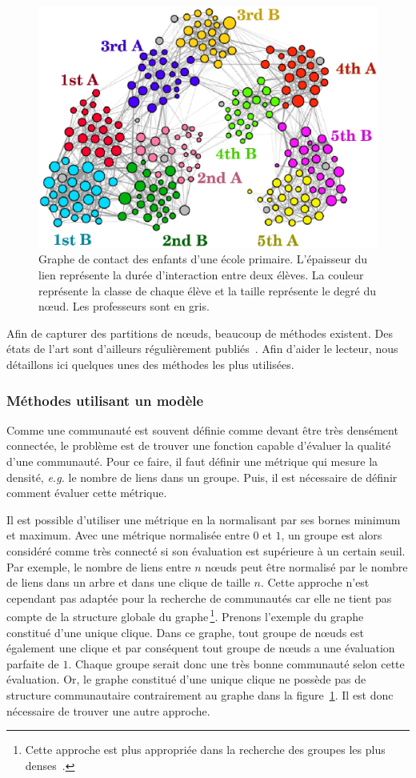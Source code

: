 \begin{figure}
\centering
\includegraphics[width=0.6\linewidth]{img/Intro/ecole_primaire}
\caption{Graphe de contact des enfants d'une école primaire. L'épaisseur du lien représente la durée d'interaction entre deux élèves. La couleur représente la classe de chaque élève et la taille représente le degré du n\oe{}ud. Les professeurs sont en gris.\protect\footnotemark}
\label{fig:ecole_primaire}
\end{figure}

Afin de capturer des partitions de n\oe{}uds, beaucoup de méthodes existent.
Des états de l'art sont d'ailleurs régulièrement publiés~\cite{Fortunato2010,Plantie2013a, Malliaros2013a, Harenberg2014a}.
Afin d'aider le lecteur, nous détaillons ici quelques unes des méthodes les plus utilisées.

\subsubsection{Méthodes utilisant un modèle}
\label{def:Modularite}
Comme une communauté est souvent définie comme devant être très densément connectée, le problème est de trouver une fonction capable d'évaluer la qualité d'une communauté.
Pour ce faire, il faut définir une métrique qui mesure la densité, \emph{e.g.} le nombre de liens dans un groupe.
Puis, il est nécessaire de définir comment évaluer cette métrique.

Il est possible d'utiliser une métrique en la normalisant par ses bornes minimum et maximum.
Avec une métrique normalisée entre $0$ et $1$, un groupe est alors considéré comme très connecté si son évaluation est supérieure à un certain seuil.
Par exemple, le nombre de liens entre $n$ n\oe{}uds peut être normalisé par le nombre de liens dans un arbre et dans une clique de taille $n$. 
Cette approche n'est cependant pas adaptée pour la recherche de communautés car elle ne tient pas compte de la structure globale du graphe\,\footnote{Cette approche est plus appropriée dans la recherche des groupes les plus denses~\cite{Balalau2015}.}.
Prenons l'exemple du graphe constitué d'une unique clique.
Dans ce graphe, tout groupe de n\oe{}uds est également une clique et par conséquent tout groupe de n\oe{}uds a une évaluation parfaite de $1$.
Chaque groupe serait donc une très bonne communauté selon cette évaluation.
Or, le graphe constitué d'une unique clique ne possède pas de structure communautaire contrairement au graphe dans la figure~\ref{fig:ecole_primaire}.
Il est donc nécessaire de trouver une autre approche.

